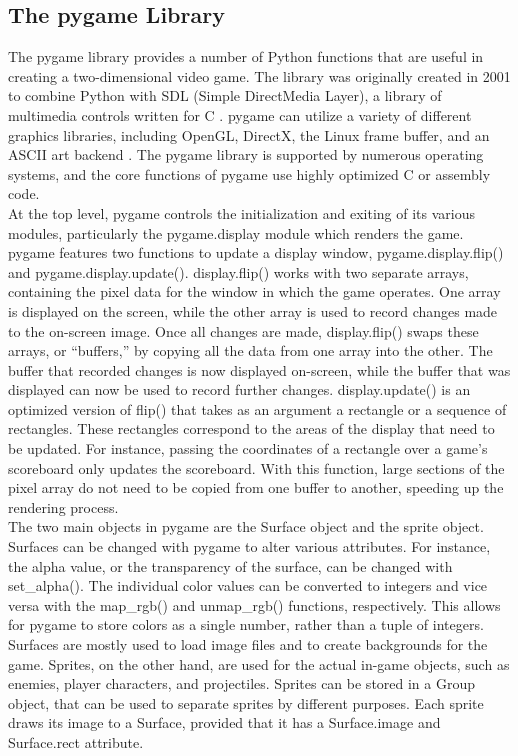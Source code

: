 \subsection{The pygame Library}
The pygame library provides a number of Python functions that are useful in creating a two-dimensional video game. The library was originally created in 2001 to combine Python with SDL (Simple DirectMedia Layer), a library of multimedia controls written for C \cite{shinners}. pygame can utilize a variety of different graphics libraries, including OpenGL, DirectX, the Linux frame buffer, and an ASCII art backend \cite{shinners}. The pygame library is supported by numerous operating systems, and the core functions of pygame use highly optimized C or assembly code.\\

At the top level, pygame controls the initialization and exiting of its various modules, particularly the pygame.display module which renders the game. pygame features two functions to update a display window, pygame.display.flip() and pygame.display.update(). display.flip() works with two separate arrays, containing the pixel data for the window in which the game operates. One array is displayed on the screen, while the other array is used to record changes made to the on-screen image. Once all changes are made, display.flip() swaps these arrays, or ``buffers,'' by copying all the data from one array into the other. The buffer that recorded changes is now displayed on-screen, while the buffer that was displayed can now be used to record further changes. display.update() is an optimized version of flip() that takes as an argument a rectangle or a sequence of rectangles. These rectangles correspond to the areas of the display that need to be updated. For instance, passing the coordinates of a rectangle over a game's scoreboard only updates the scoreboard. With this function, large sections of the pixel array do not need to be copied from one buffer to another, speeding up the rendering process.\\

The two main objects in pygame are the Surface object and the sprite object. Surfaces can be changed with pygame to alter various attributes. For instance, the alpha value, or the transparency of the surface, can be changed with set\_alpha(). The individual color values can be converted to integers and vice versa with the map\_rgb() and unmap\_rgb() functions, respectively. This allows for pygame to store colors as a single number, rather than a tuple of integers. Surfaces are mostly used to load image files and to create backgrounds for the game. Sprites, on the other hand, are used for the actual in-game objects, such as enemies, player characters, and projectiles. Sprites can be stored in a Group object, that can be used to separate sprites by different purposes. Each sprite draws its image to a Surface, provided that it has a Surface.image and Surface.rect attribute.\\

